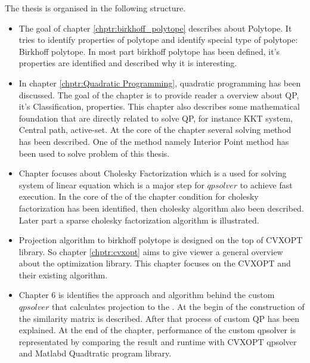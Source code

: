 The thesis is organised in the following structure.
\begin{itemize}
	\item The goal of chapter \ref{chptr:birkhoff_polytope} describes about Polytope. It tries to identify properties of polytope and identify special type of polytope: Birkhoff polytope. In most part birkhoff polytope has been defined, it's properties are identified and described why it is interesting.
	\item In chapter \ref{chptr:Quadratic Programming}, quadratic programming has been discussed. The goal of the chapter is to provide reader a  overview about QP, it's Classification,  properties. This chapter also describes some mathematical foundation that are directly related to solve QP, for instance KKT system, Central path, active-set. At the core of the chapter several solving method has been described. One of the method namely Interior Point method has been used to solve problem of this thesis.
	\item Chapter focuses about Cholesky Factorization which is a used for solving system of linear equation which is a major step for $qpsolver$ to achieve fast execution. In the core of the of the chapter condition for cholesky factorization has been identified, then cholesky algorithm also been described. Later part a sparse cholesky factorization algorithm is illustrated.
	\item Projection algorithm to birkhoff polytope is designed on the top of CVXOPT library. So chapter \ref{chptr:cvxopt}  aims to give viewer a general overview about the optimization library. This chapter focuses on the CVXOPT  and their existing algorithm. 
	\item Chapter 6 is identifies the approach and algorithm behind the custom $qpsolver$ that calculates projection to the . At the begin of the construction of the similarity matrix is described. After that process of custom QP has been explained. At the end of the chapter, performance of the  custom qpsolver is representated by comparing the result and runtime with CVXOPT qpsolver and Matlabd Quadtratic program library.
\end{itemize}
































